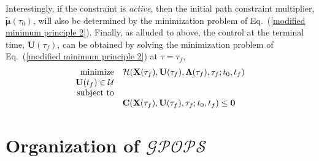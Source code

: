 \documentclass[10pt,final]{report}
\newcommand{\gpops}{$\mathcal{GPOPS}$~}
\begin{document}
Interestingly, if the constraint is {\em active}, then the initial path constraint multiplier,
$\tilde{\boldsymbol{\mu}}(\tau_0)$, will also be determined by the minimization
problem of Eq.~(\ref{modified minimum principle 2}).   Finally, as alluded to
above, the control at the terminal time, $\textbf{U}(\tau_f)$, can be obtained by
solving the minimization problem of Eq.~(\ref{modified minimum principle 2})
at $\tau=\tau_f$, \ie
\begin{equation}\label{modified minimum principle 3}
  \begin{array}{rl}
    \displaystyle\textrm{minimize} &  {\cal
    H}(\textbf{X}(\tau_f),\textbf{U}(\tau_f),\boldsymbol{\Lambda}(\tau_f),\tau_f;t_0,t_f) \\
    {\textbf{U}(t_f)\in {\cal U}} \\
    \textrm{subject to} \\
    & \textbf{C}(\textbf{X}(\tau_f),\textbf{U}(\tau_f),\tau_f;t_0,t_f) \leq \textbf{0}
  \end{array}
\end{equation}

\section{Organization of \gpops}
\end{document}
